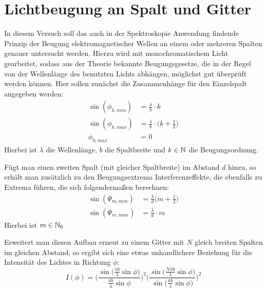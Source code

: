 \chapter{Lichtbeugung an Spalt und Gitter}
In diesem Versuch soll das auch in der Spektroskopie Anwendung findende Prinzip der Beugung elektromagnetischer Wellen an einem oder mehreren Spalten genauer untersucht werden. Hierzu wird mit monochromatischem Licht gearbeitet, sodass aus der Theorie bekannte Beugungsgesetze, die in der Regel von der Wellenlänge des benutzten Lichts abhängen, möglichst gut überprüft werden können. Hier sollen zunächst die Zusammenhänge für den Einzelspalt angegeben werden:
\begin{align*}
	\sin(\phi_{k,min})&=\frac{\lambda}{b}\cdot k\\
	\sin(\phi_{k,max})&=\frac{\lambda}{b}\cdot\Big(k+\frac{1}{2}\Big)\\
	\phi_{0,max}&=0
\end{align*}
Hierbei ist $\lambda$ die Wellenlänge, $b$ die Spaltbreite und $k\in\mathbb{N}$ die Beugungsordnung.

Fügt man einen zweiten Spalt (mit gleicher Spaltbreite) im Abstand $d$ hinzu, so erhält man zusätzlich zu den Beugungsextrema Interferenzeffekte, die ebenfalls zu Extrema führen, die sich folgendermaßen berechnen:
\begin{align*}
	\sin(\Psi_{m,min})&=\frac{\lambda}{d}\Big(m+\frac{1}{2}\Big)\\
	\sin(\Psi_{m,max})&=\frac{\lambda}{d}\cdot m
\end{align*}
Hierbei ist $m\in\mathbb{N}_{0}$

Erweitert man diesen Aufbau erneut zu einem Gitter mit $N$ gleich breiten Spalten im gleichen Abstand, so ergibt sich eine etwas unhandlichere Beziehung für die Intensität des Lichtes in Richtung $\phi$:
\begin{displaymath}
	I(\phi)=\Bigg(\frac{\sin\Big(\frac{\pi b}{\lambda}\sin\phi\Big)}{\frac{\pi b}{\lambda}\sin\phi}\Bigg)^2\Bigg(\frac{\sin\Big(\frac{N\pi b}{\lambda}\sin\phi\Big)}{\sin\Big(\frac{\pi b}{\lambda}\sin\phi\Big)}\Bigg)^2
\end{displaymath}
